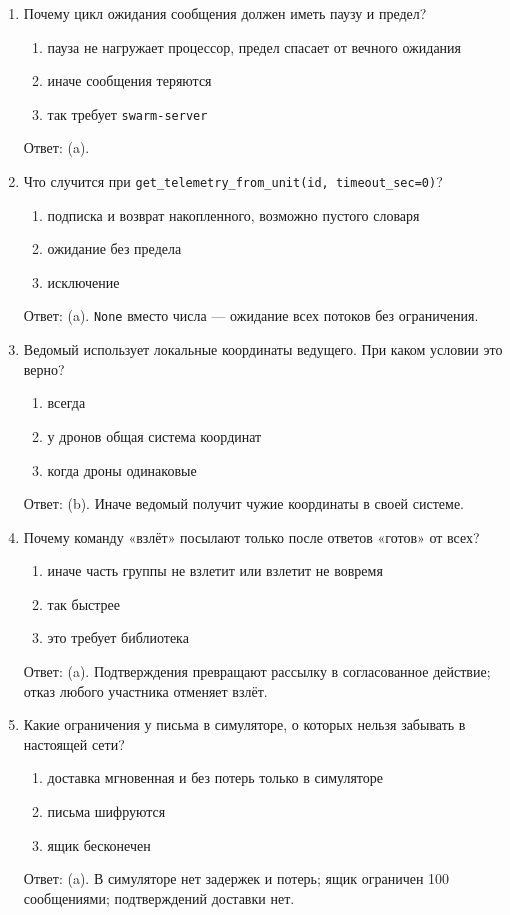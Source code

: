 \begin{enumerate}
    Ответ: (b). Метод не ждёт; ждать нужно опросом с паузой и пределом.
  \item Почему цикл ожидания сообщения должен иметь паузу и предел?
    \begin{enumerate}[label=(\alph*)] \item пауза не нагружает процессор, предел спасает от вечного ожидания \item иначе сообщения теряются \item так требует \texttt{swarm-server} \end{enumerate}
    Ответ: (a).
  \item Что случится при \verb|get_telemetry_from_unit(id, timeout_sec=0)|?
    \begin{enumerate}[label=(\alph*)] \item подписка и возврат накопленного, возможно пустого словаря \item ожидание без предела \item исключение \end{enumerate}
    Ответ: (a). \verb|None| вместо числа --- ожидание всех потоков без ограничения.
  \item Ведомый использует локальные координаты ведущего. При каком условии это верно?
    \begin{enumerate}[label=(\alph*)] \item всегда \item у дронов общая система координат \item когда дроны одинаковые \end{enumerate}
    Ответ: (b). Иначе ведомый получит чужие координаты в своей системе.
  \item Почему команду «взлёт» посылают только после ответов «готов» от всех?
    \begin{enumerate}[label=(\alph*)] \item иначе часть группы не взлетит или взлетит не вовремя \item так быстрее \item это требует библиотека \end{enumerate}
    Ответ: (a). Подтверждения превращают рассылку в согласованное действие; отказ любого участника отменяет взлёт.
  \item Какие ограничения у письма в симуляторе, о которых нельзя забывать в настоящей сети?
    \begin{enumerate}[label=(\alph*)] \item доставка мгновенная и без потерь только в симуляторе \item письма шифруются \item ящик бесконечен \end{enumerate}
    Ответ: (a). В симуляторе нет задержек и потерь; ящик ограничен 100 сообщениями; подтверждений доставки нет.
\end{enumerate}

